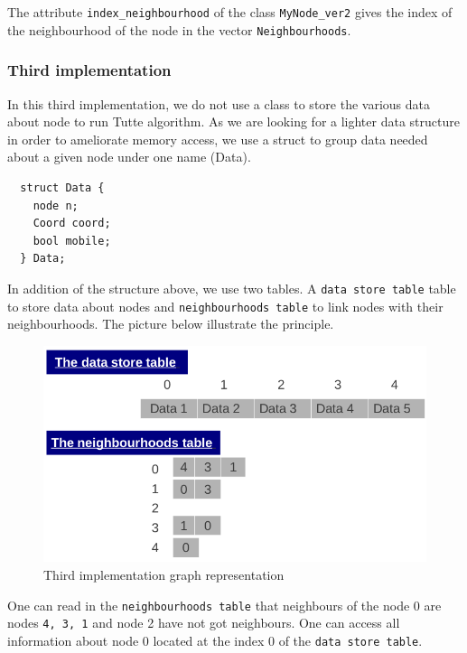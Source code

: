 The attribute \verb+index_neighbourhood+ of the class \verb+MyNode_ver2+
gives the index of the neighbourhood of the node in the vector \verb+Neighbourhoods+.

\subsubsection{Third implementation}
In this third implementation, we do not use a class to store the
various data about node to run Tutte algorithm. 
As we are looking for a lighter data structure in order to ameliorate 
memory access, we use a \textsf{struct} to group data needed about a given node
under one name (\textsf{Data}). 
\begin{lstlisting}
  struct Data {
    node n;
    Coord coord;
    bool mobile;
  } Data;
\end{lstlisting}
In addition of the structure above, we use two tables. A \texttt{data store table} table to store data about nodes and \texttt{neighbourhoods table} to link nodes with their neighbourhoods. The picture below illustrate the principle.
\begin {figure}[H]
  \centering
  \includegraphics[scale=0.5]{img/struct3.png}
  \caption{Third implementation graph representation}
  \label{struct3}
\end {figure}
\noindent One can read in the \texttt{neighbourhoods table} that neighbours of the node 0 are nodes \texttt{4, 3,  1} and node 2 have not got neighbours. One can access all information about node 0 located at the index 0 of the \texttt{data store table}.  
